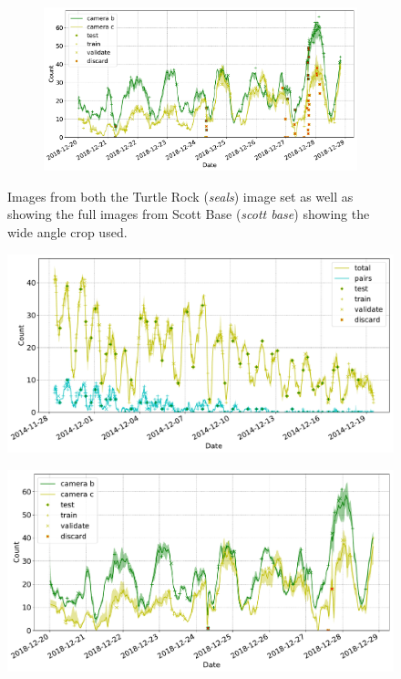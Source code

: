 \begin{figure}[h!]
\begin{subfigure}[t]{1.0\linewidth}
  \includegraphics[width=1.0\linewidth]{charts/seals/scott_base.pdf}
  \caption{}
\end{subfigure}

\caption{ Images from both the Turtle Rock (\emph{seals}) image set as well as showing the full images from Scott Base (\emph{scott base}) showing the wide angle crop used.  }
\label {fig:weddell_images}
\end{figure}



\begin{figure}
    \centering
    \includegraphics[width=1.0\linewidth]{charts/seals/seals.pdf}
    \caption{}
    \label{fig:seals_timeseries}
\end{figure}

\begin{figure}
    \centering
    \includegraphics[width=1.0\linewidth]{charts/seals/scott_base_100.pdf}
    \caption{}
    \label{fig:seals_timeseries}
\end{figure}

